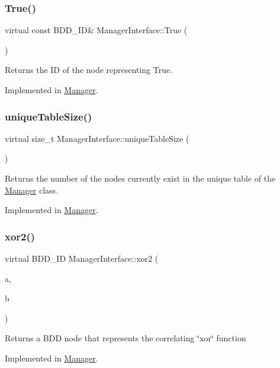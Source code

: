 \subsubsection{\texorpdfstring{True()}{True()}}
{\footnotesize\ttfamily virtual const B\+D\+D\+\_\+\+ID\& Manager\+Interface\+::\+True (\begin{DoxyParamCaption}{ }\end{DoxyParamCaption})\hspace{0.3cm}{\ttfamily [pure virtual]}}

\begin{DoxyReturn}{Returns}
the ID of the node representing True. 
\end{DoxyReturn}


Implemented in \hyperlink{classManager_a0c15aff167a7019502b66100c4ec0a33}{Manager}.

\mbox{\label{classManagerInterface_a88f79dbba9be5dc2a4e0fb21ac627c98}} 
\subsubsection{\texorpdfstring{unique\+Table\+Size()}{uniqueTableSize()}}
{\footnotesize\ttfamily virtual size\+\_\+t Manager\+Interface\+::unique\+Table\+Size (\begin{DoxyParamCaption}{ }\end{DoxyParamCaption})\hspace{0.3cm}{\ttfamily [pure virtual]}}

\begin{DoxyReturn}{Returns}
the number of the nodes currently exist in the unique table of the \hyperlink{classManager}{Manager} class. 
\end{DoxyReturn}


Implemented in \hyperlink{classManager_a82b10a42ec726d42ea4d2e8bc72a3db9}{Manager}.

\mbox{\label{classManagerInterface_a47d905e239650c255330b841edabd59d}} 
\subsubsection{\texorpdfstring{xor2()}{xor2()}}
{\footnotesize\ttfamily virtual B\+D\+D\+\_\+\+ID Manager\+Interface\+::xor2 (\begin{DoxyParamCaption}\item[{const B\+D\+D\+\_\+\+ID}]{a,  }\item[{const B\+D\+D\+\_\+\+ID}]{b }\end{DoxyParamCaption})\hspace{0.3cm}{\ttfamily [pure virtual]}}

\begin{DoxyReturn}{Returns}
a B\+DD node that represents the correlating \char`\"{}xor\char`\"{} function 
\end{DoxyReturn}


Implemented in \hyperlink{classManager_a2582e9a9474189a2710c551548c20c19}{Manager}.

